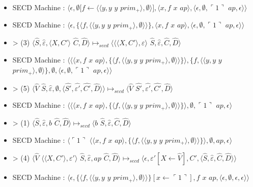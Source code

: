 \documentclass[10pt,a4paper]{report}
\begin{document}
\begin{itemize}
\item[] SECD Machine : $\langle\epsilon,\emptyset[f \leftarrow \langle\langle y,y$ $y$ $prim_{+}\rangle,\emptyset\rangle],\langle x,f$ $x$ $ap\rangle,\langle\epsilon,\emptyset,\ulcorner 1\urcorner$ $ap,\epsilon\rangle\rangle$
\item[] SECD Machine : $\langle\epsilon,\{\langle f,\langle\langle y,y$ $y$ $prim_{+}\rangle,\emptyset\rangle\rangle\},\langle x,f$ $x$ $ap\rangle,\langle\epsilon,\emptyset,\ulcorner 1\urcorner$ $ap,\epsilon\rangle\rangle$
\item[] >  (3) $\langle\widehat{S},\widehat{\varepsilon},\langle X,C'\rangle$ $\widehat{C},\widehat{D}\rangle \longmapsto_{secd} \langle\langle\langle X,C'\rangle,\varepsilon\rangle$ $\widehat{S},\widehat{\varepsilon},\widehat{C},\widehat{D}\rangle$
\item[] SECD Machine : $\langle\langle\langle x,f$ $x$ $ap\rangle,\{\langle f,\langle\langle y,y$ $y$ $prim_{+}\rangle,\emptyset\rangle\rangle\}\rangle,\{f,\langle\langle y,y$ $y$ $prim_{+}\rangle,\emptyset\rangle\},\emptyset,\langle\epsilon,\emptyset,\ulcorner 1\urcorner$ $ap,\epsilon\rangle\rangle$
\item[] > (5) $\langle\widehat{V}$ $\widehat{S},\widehat{\varepsilon},\emptyset,\langle\widehat{S'},\widehat{\varepsilon'},\widehat{C'},\widehat{D}\rangle\rangle \longmapsto_{secd} \langle \widehat{V}$ $\widehat{S'},\widehat{\varepsilon'},\widehat{C'},\widehat{D}\rangle$
\item[] SECD Machine : $\langle\langle\langle x,f$ $x$ $ap\rangle,\{\langle f,\langle\langle y,y$ $y$ $prim_{+}\rangle,\emptyset\rangle\rangle\}\rangle,\emptyset,\ulcorner 1\urcorner$ $ap,\epsilon\rangle$
\item[] >  (1) $\langle\widehat{S},\widehat{\varepsilon},b$ $\widehat{C},\widehat{D}\rangle \longmapsto_{secd} \langle b$ $\widehat{S},\widehat{\varepsilon},\widehat{C},\widehat{D}\rangle$
\item[] SECD Machine :  $\langle\ulcorner 1\urcorner$ $\langle\langle x,f$ $x$ $ap\rangle,\{\langle f,\langle\langle y,y$ $y$ $prim_{+}\rangle,\emptyset\rangle\rangle\}\rangle,\emptyset,ap,\epsilon\rangle$
\item[] >  (4) $\langle\widehat{V}$ $\langle\langle X,C'\rangle,\varepsilon'\rangle$ $\widehat{S},\widehat{\varepsilon},ap$ $\widehat{C},\widehat{D}\rangle \longmapsto_{secd} \langle\epsilon,\varepsilon'[X \leftarrow \widehat{V}],C',\langle\widehat{S},\widehat{\varepsilon},\widehat{C},\widehat{D}\rangle\rangle$
\item[] SECD Machine : $\langle\epsilon,\{\langle f,\langle\langle y,y$ $y$ $prim_{+}\rangle,\emptyset\rangle\rangle\}[x \leftarrow \ulcorner 1\urcorner],f$ $x$ $ap,\langle\epsilon,\emptyset,\epsilon,\epsilon\rangle\rangle$

\end{itemize}
\end{document}
